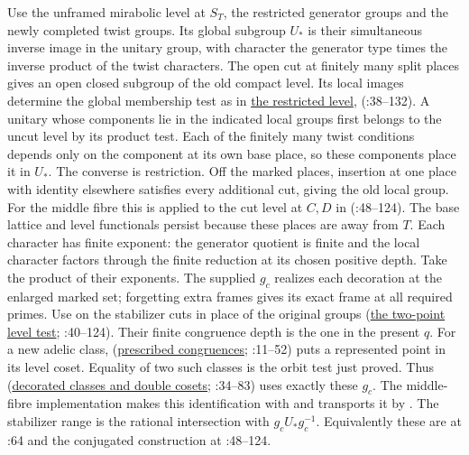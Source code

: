 Use the unframed mirabolic level at $S_T$, the restricted generator
groups and the newly completed twist groups. Its global subgroup
$U_*$ is their simultaneous inverse image in the unitary group,
with character the generator type times the inverse product of the
twist characters. The open cut at finitely many split places gives
an open closed subgroup of the old compact level. Its local images
determine the global membership test as in
\hyperref[r13:s9-shrink]{the restricted level}, 
(:38--132).
A unitary whose components lie in the indicated local groups first belongs
to the uncut level by its product test. Each of the finitely many
twist conditions depends only on the component at its own base place,
so these components place it in $U_*$. The converse is restriction.
Off the marked places, insertion at one place with identity elsewhere
satisfies every additional cut, giving the old local group. For the
middle fibre this is applied to the cut level at $C,D$ in
 (:48--124). The base lattice
and level functionals persist because these places are away from $T$.
Each character has finite exponent: the generator quotient is finite
and the local character factors through the finite reduction at its
chosen positive depth. Take the product of their exponents.
The supplied $g_c$ realizes each decoration at the enlarged marked
set; forgetting extra frames gives its exact frame at all required
primes. Use  on the
stabilizer cuts in place of the original groups
(\hyperref[r13:s9-twopoints]{the two-point level test}; :40--124).
Their finite congruence depth is the one in the present $q$.
For a new adelic class, 
(\hyperref[r13:s9-congruence]{prescribed congruences}; :11--52)
puts a represented point in its level coset. Equality of two such classes
is the orbit test just proved. Thus 
(\hyperref[r13:s9-cosets]{decorated classes and double cosets}; :34--83)
uses exactly these $g_c$. The middle-fibre implementation makes this
identification with  and transports it by . The
stabilizer range is the rational intersection with $g_cU_*g_c^{-1}$.
Equivalently these are  at :64
and the conjugated construction at
:48--124.

